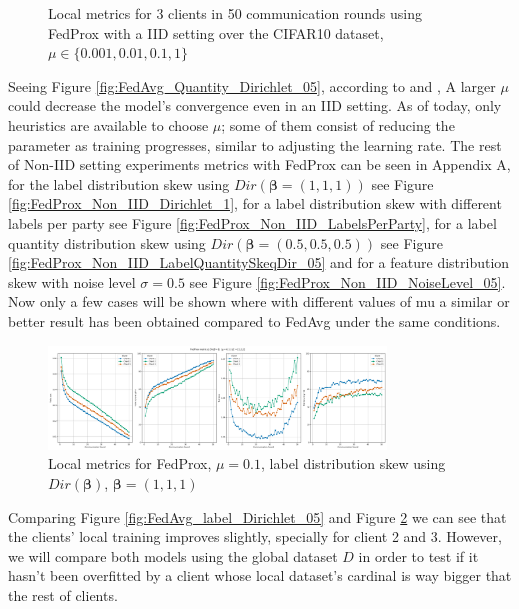 \begin{figure}[H]
    \caption{Local metrics for 3 clients in 50 communication rounds using FedProx with a IID setting over the CIFAR10 dataset, $\mu \in \{0.001, 0.01, 0.1, 1\}$}
    \label{fig:FedProx_IID}
\end{figure}

Seeing Figure \ref{fig:FedAvg_Quantity_Dirichlet_05}, according to \cite*{li2020} and \cite*{li2021}, A larger $\mu$  could decrease the model's convergence even in an IID setting. As of today, only heuristics are available to choose $\mu$; some of them consist of reducing the parameter as training progresses, similar to adjusting the learning rate. The rest of Non-IID setting experiments metrics with FedProx can be seen in Appendix A, for the label distribution skew using $Dir(\boldsymbol{\beta} = (1,1,1))$ see Figure \ref{fig:FedProx_Non_IID_Dirichlet_1}, for a label distribution skew with different labels per party see Figure \ref{fig:FedProx_Non_IID_LabelsPerParty}, for a label quantity distribution skew using $Dir(\boldsymbol{\beta}=(0.5,0.5,0.5))$ see Figure \ref{fig:FedProx_Non_IID_LabelQuantitySkeqDir_05} and for a feature distribution skew with noise level $\sigma = 0.5$ see Figure \ref{fig:FedProx_Non_IID_NoiseLevel_05}.\\
Now only a few cases will be shown where with different values of mu a similar or better result has been obtained compared to FedAvg under the same conditions.

\begin{figure}[H]
  \centering
  \includegraphics[width=0.8\textwidth]{figures/2-Federated_Learning/FedProx_Dirichlet_1_mu_0.1.png}
  \caption{Local metrics for FedProx, $\mu = 0.1$, label distribution skew using $Dir(\boldsymbol{\beta})$, $\boldsymbol{\beta} = (1,1,1)$}
  \label{fig:FedProx_LabelsSkewDir_1_Mu_0.1}
\end{figure}
 
Comparing Figure \ref{fig:FedAvg_label_Dirichlet_05} and Figure \ref{fig:FedProx_LabelsSkewDir_1_Mu_0.1} we can see that the clients' local training improves slightly, specially for client 2 and 3. However, we will compare both models using the global dataset $D$ in order to test if it hasn't been overfitted by a client whose local dataset's cardinal is way bigger that the rest of clients. 

